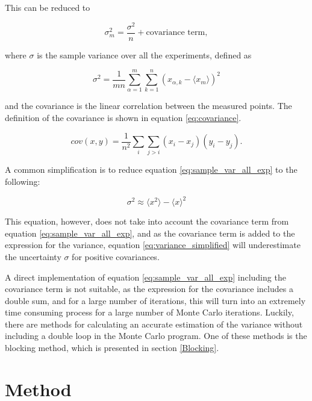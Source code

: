 \documentclass[norsk,a4paper,12pt]{article}
\begin{document}
This can be reduced to 

\begin{equation}
\label{eq:sample_var_all_exp}
\sigma_m^2 = \frac{\sigma^2}{n} + \text{covariance term},
\end{equation}

where $\sigma$ is the sample variance over all the experiments, defined as 

\begin{equation}
\sigma^2 = \frac{1}{mn} \sum_{\alpha=1}^m \sum_{k=1}^n (x_{\alpha, k} - \langle x_m \rangle )^2
\end{equation}

and the covariance is the linear correlation between the measured points. The definition of the covariance is shown in equation \ref{eq:covariance}.

\begin{equation}
\label{eq:covariance}
cov(x,y) = \frac{1}{n^2} \sum_i \sum_{j >i} (x_i - x_j) (y_i - y_j).
\end{equation}

A common simplification is to reduce equation \ref{eq:sample_var_all_exp} to the following:

\begin{equation}
\label{eq:variance_simplified}
\sigma^2 \approx \langle x^2 \rangle - \langle x \rangle^2
\end{equation}

This equation, however, does not take into account the covariance term from equation \ref{eq:sample_var_all_exp}, and as the covariance term is added to the expression for the variance, equation \ref{eq:variance_simplified} will underestimate the uncertainty $\sigma$ for positive covariances.

A direct implementation of equation \ref{eq:sample_var_all_exp} including the covariance term is not suitable, as the expression for the covariance includes a double sum, and for a large number of iterations, this will turn into an extremely time consuming process for a large number of Monte Carlo iterations. Luckily, there are methods for calculating an accurate estimation of the variance without including a double loop in the Monte Carlo program. One of these methods is the blocking method, which is presented in section \ref{Blocking}.

\section{Method} \label{Method}
\end{document}
